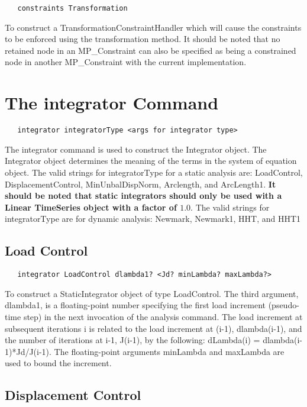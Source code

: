 \documentclass[12pt]{article}
\begin{document}
{\sf\small
\begin{verbatim}
   constraints Transformation 
\end{verbatim}
}

\noindent To construct a TransformationConstraintHandler which will cause the
constraints to be enforced using the transformation method. It should be noted
that no retained node in an MP\_Constraint can also be specified as being a
constrained node in another MP\_Constraint with the current implementation.

\section {The integrator Command}
{\sf\small
\begin{verbatim}
   integrator integratorType <args for integrator type>
\end{verbatim}
}

The integrator command is used to construct the Integrator
object. The Integrator object determines the meaning of the terms in
the system of equation object. The valid strings for
integratorType for a static analysis are: LoadControl,
DisplacementControl, MinUnbalDispNorm, Arclength, and ArcLength1.
{\bf It should be noted that static
integrators should only be used with a Linear TimeSeries object with a
factor of $1.0$}. The valid strings for integratorType are for dynamic
analysis: Newmark, Newmark1, HHT, and HHT1

\subsection{Load Control}

{\sf\small
\begin{verbatim}
   integrator LoadControl dlambda1? <Jd? minLambda? maxLambda?>
\end{verbatim}
}

To construct a StaticIntegrator object of type LoadControl. The third
argument, dlambda1, is a floating-point number specifying the first
load increment (pseudo-time step) in the next invocation of the
analysis command. The load increment at subsequent iterations i is
related to the load increment at (i-1), dlambda(i-1), and the number
of iterations at i-1, J(i-1), by the following: dLambda(i) =
dlambda(i-1)*Jd/J(i-1). The floating-point arguments minLambda and
maxLambda are used to bound the increment.

\subsection{Displacement Control}
\end{document}
